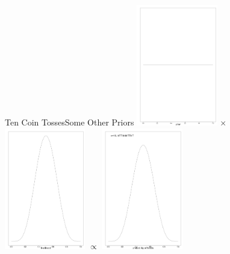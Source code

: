 \documentclass[dvipsnames,mathserif, handout]{beamer}
\begin{document}
{\begin{frame}{Ten Coin Tosses}{Some Other Priors}
		\includegraphics[valign=m, width=100pt]{cointosses/uniform_prior.pdf} $\times$
	    	\includegraphics[valign=m, width=100pt]{cointosses/Ten_pre.pdf} $\propto$
	    	\includegraphics[valign=m, width=100pt]{cointosses/Ten.pdf}
\end{frame}

}
\end{document}
